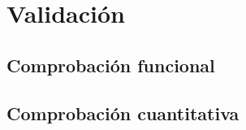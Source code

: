 \section{Validación}
\label{sec:vali}

\subsection{Comprobación funcional}

\subsection{Comprobación cuantitativa}
